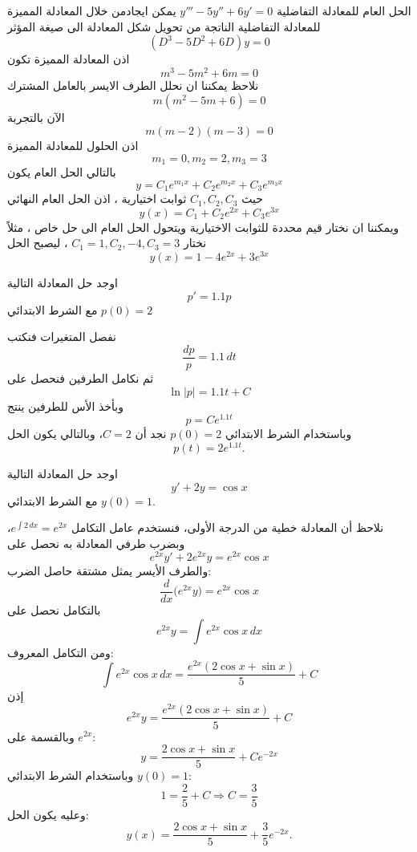 \begin{example}
    الحل العام للمعادلة التفاضلية $y'''-5y''+6y'=0$ يمكن ايجادمن خلال المعادلة المميزة للمعادلة التفاضلية الناتجة من تحويل شكل المعادلة الى صيغة المؤثر
    \[
    (D^3 - 5D^2 + 6D) y = 0
    \]
    اذن المعادلة المميزة تكون
    \[
    m^3 - 5m^2 + 6m = 0
    \]
    نلاحظ يمكننا ان نحلل الطرف الايسر بالعامل المشترك
    \[
    m(m^2 - 5m + 6) = 0
    \]
    الآن بالتجربة
    \[
    m(m-2)(m-3) = 0
    \]
    اذن الحلول للمعادلة المميزة
    \[
    m_1 = 0 , m_2 = 2, m_3 = 3
    \]
    بالتالي الحل العام يكون
    \[
    y = C_1 e^{m_1x} + C_2 e^{m_2 x} + C_3 e^{m_3 x}
    \]
   حيث $C_1, C_2, C_3 $ ثوابت اختيارية ، اذن الحل العام النهائي
    \[
    y(x) = C_1 + C_2 e^{2x} + C_3 e^{3x}
    \]
     ويمكننا ان نختار قيم محددة للثوابت الاختيارية ويتحول الحل العام الى حل خاص ، مثلاً نختار \linebreak
     $C_1 = 1, C_2, -4, C_3 = 3$ ، ليصبح الحل
    \[
    y(x) = 1 -4e^{2x} + 3e^{3x}
    \]
\end{example}

\begin{example}\label{ex:popexample}
	اوجد حل المعادلة التالية
	\[
	p' = 1.1 p
	\]
	مع الشرط الابتدائي $p(0)=2$
\end{example}
\begin{solution}
	نفصل المتغيرات فنكتب
	\[
	\frac{dp}{p} = 1.1\, dt
	\]
	ثم نكامل الطرفين فنحصل على
	\[
	\ln |p| = 1.1 t + C
	\]
	وبأخذ الأس للطرفين ينتج
	\[
	p = C e^{1.1 t}
	\]
	وباستخدام الشرط الابتدائي \(p(0)=2\) نجد أن \(C=2\)، وبالتالي يكون الحل
	\[
	p(t) = 2 e^{1.1 t}.
	\]
\end{solution}

\begin{example}
	اوجد حل المعادلة التالية
	\[
	y' +2y = \cos x
	\]
	مع الشرط الابتدائي $y(0)=1 $.
\end{example}
\begin{solution}
	نلاحظ أن المعادلة خطية من الدرجة الأولى، فنستخدم عامل التكامل \(e^{\int 2\,dx}=e^{2x}\)، وبضرب طرفي المعادلة به نحصل على
	\[
	e^{2x}y' + 2e^{2x}y = e^{2x}\cos x
	\]
	والطرف الأيسر يمثل مشتقة حاصل الضرب:
	\[
	\frac{d}{dx}\big(e^{2x}y\big) = e^{2x}\cos x
	\]
	بالتكامل نحصل على
	\[
	e^{2x}y = \int e^{2x}\cos x\,dx
	\]
	ومن التكامل المعروف:
	\[
	\int e^{2x}\cos x\,dx = \frac{e^{2x}(2\cos x + \sin x)}{5} + C
	\]
	إذن
	\[
	e^{2x}y = \frac{e^{2x}(2\cos x + \sin x)}{5} + C
	\]
	وبالقسمة على \(e^{2x}\):
	\[
	y = \frac{2\cos x + \sin x}{5} + Ce^{-2x}
	\]
	وباستخدام الشرط الابتدائي \(y(0)=1\):
	\[
	1 = \frac{2}{5} + C
	\Rightarrow C = \frac{3}{5}
	\]
	وعليه يكون الحل:
	\[
	y(x) = \frac{2\cos x + \sin x}{5} + \frac{3}{5}e^{-2x}.
	\]
\end{solution}

